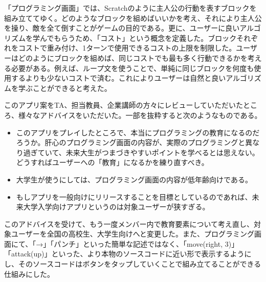 \documentclass[openany,11pt,papersize]{jsbook}
\begin{document}
\par 「プログラミング画面」では、Scratchのように主人公の行動を表すブロックを組み立ててゆく。どのようなブロックを組めばいいかを考え、それにより主人公を操り、敵を全て倒すことがゲームの目的である。更に、ユーザーに良いアルゴリズムを学んでもらうため、「コスト」という概念を定義した。ブロックそれぞれをコストで重み付け、1ターンで使用できるコストの上限を制限した。ユーザーはどのようにブロックを組めば、同じコストでも最も多く行動できるかを考える必要がある。例えば、ループ文を使うことで、単純に同じブロックを何度も使用するよりも少ないコストで済む。これによりユーザーは自然と良いアルゴリズムを学ぶことができると考えた。
\par このアプリ案をTA、担当教員、企業講師の方々にレビューしていただいたところ、様々なアドバイスをいただいた。一部を抜粋すると次のようなものである。
\begin{itemize}
 \item このアプリをプレイしたところで、本当にプログラミングの教育になるのだろうか。肝心のプログラミング画面の内容が、実際のプログラミングと異なり過ぎていて、未来大生がつまづきやすいポイントを学べるとは思えない。どうすればユーザーへの「教育」になるかを練り直すべき。
 \item 大学生が使うにしては、プログラミング画面の内容が低年齢向けである。
 \item もしアプリを一般向けにリリースすることを目標としているのであれば、未来大学入学向けアプリというのは対象ユーザーが狭すぎる。
 \end{itemize}
\par このアドバイスを受けて、もう一度メンバー内で教育要素について考え直し、対象ユーザーを全国の高校生、大学生向けへと変更した。また、プログラミング画面にて、「→」「パンチ」といった簡単な記述ではなく、「move(right, 3)」「attack(up)」といった、より本物のソースコードに近い形で表示するようにし、そのソースコードはボタンをタップしていくことで組み立てることができる仕組みにした。
\end{document}
